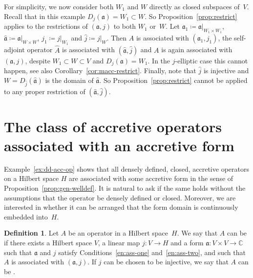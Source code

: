 \documentclass[a4paper,oneside,12pt]{amsart}
\theoremstyle{plain}
\theoremstyle{definition}
\newtheorem{definition}[theorem]{Definition}
\newenvironment{example}
{\pushQED{\qed}

\examplex}
{\popQED\endexamplex}
\begin{document}
\begin{example}
For simplicity, we now consider both $W_1$ and $W$ directly as closed subspaces of~$V$. 
Recall that in this example $D_j({{\mathfrak{{a}}}})=W_1\subset W$. 
So Proposition~\ref{prop:restrict} applies to the restrictions of $({{\mathfrak{{a}}}},j)$ to both $W_1$ or~$W$.
Let ${{\mathfrak{{a}}}}_1\coloneqq{\ensuremath{{{{\mathfrak{{a}}}}}|_{{W_1\times W_1}}}}$, ${{\mathfrak{{\hat{a}}}}}\coloneqq{\ensuremath{{{{\mathfrak{{a}}}}}|_{{W\times W}}}}$, $j_1\coloneqq {\ensuremath{{j}|_{{W_1}}}}$ and $\hat{j}\coloneqq{\ensuremath{{j}|_{{W}}}}$.
Then $A$ is associated with $({{\mathfrak{{a}}}}_1,j_1)$, 
the self-adjoint operator $\widehat{A}$ is associated with $({{\mathfrak{{\hat{a}}}}},\hat{j})$ 
and $A$ is again associated with $({{\mathfrak{{a}}}},j)$, 
despite $W_1\subset W\subset V$ and $D_j({{\mathfrak{{a}}}})=W_1$. In the $j$-elliptic case this cannot happen, see also Corollary~\ref{cor:macc-restrict}.
Finally, note that $\hat{j}$ is injective and $W = D_{\hat{j}}({{\mathfrak{{\hat{a}}}}})$ is the domain of ${{\mathfrak{{\hat{a}}}}}$.
So Proposition~\ref{prop:restrict} cannot be applied to any proper restriction of $({{\mathfrak{{\hat{a}}}}},\hat{j})$.
\end{example}

\section{The class of accretive operators associated with an accretive form}\label{sec:gen-nondense}

Example~\ref{ex:dd-acc-op} shows that all densely defined, closed, accretive operators on a Hilbert space $H$ are
associated with some accretive form in the sense of Proposition~\ref{prop:gen-welldef}.
It is natural to ask if the same holds without the assumptions that the operator be densely defined or closed.
Moreover, we are interested in whether it can be arranged that the form domain is continuously embedded into~$H$.

\begin{definition}
Let $A$ be an operator in a Hilbert space~$H$.
We say that $A$ can be {\textbf{\unboldmath}} if there exists a Hilbert space $V$, 
a linear map $j\colon V\to H$ and a form ${{\mathfrak{{a}}}}\colon V\times V\to{\mathbb{C}}$ such that
${{\mathfrak{{a}}}}$ and $j$ satisfy Conditions~\ref{en:ass-one} and~\ref{en:ass-two},
and such that $A$ is associated with $({{\mathfrak{{a}}}},j)$.
If $j$ can be chosen to be injective, we say that $A$ can be {\textbf{\unboldmath}}.
\end{definition}
\end{document}
